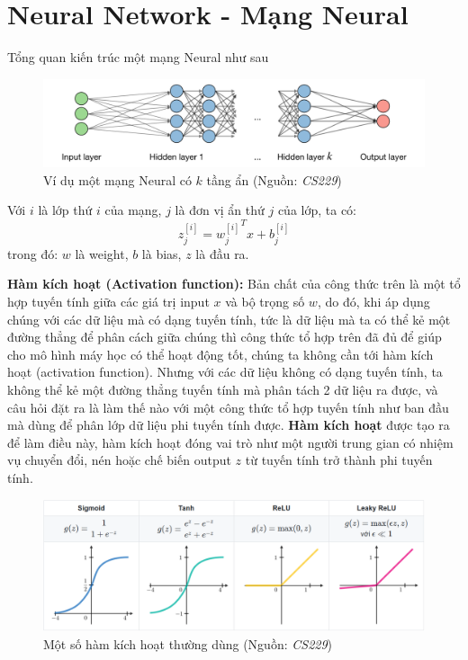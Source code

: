 \documentclass[a4paper, 12pt]{report}
\begin{document}
\section{Neural Network - Mạng Neural}
Tổng quan kiến trúc một mạng Neural như sau\par
\begin{figure}[!h]
	\centering
	\includegraphics[width=0.8\linewidth]{Images/nn1}
	\caption{Ví dụ một mạng Neural có $k$ tầng ẩn (Nguồn: \textit{CS229})}
	\label{fig:nn1}
\end{figure}
Với $i$ là lớp thứ $i$ của mạng, $j$ là đơn vị ẩn thứ $j$ của lớp, ta có:
$$ z_j^{[i]} = {w_j^{[i]}}^Tx + b_j^{[i]}$$
trong đó: $w$ là weight, $b$ là bias, $z$ là đầu ra. \par
\textbf{Hàm kích hoạt (Activation function):} Bản chất của công thức trên là một tổ hợp tuyến tính giữa các giá trị input $x$ và bộ trọng số $w$, do đó, khi áp dụng chúng với các dữ liệu mà có dạng tuyến tính, tức là dữ liệu mà ta có thể kẻ một đường thẳng để phân cách giữa chúng thì công thức tổ hợp trên đã đủ để giúp cho mô hình máy học có thể hoạt động tốt, chúng ta không cần tới hàm kích hoạt (activation function). Nhưng với các dữ liệu không có dạng tuyến tính, ta không thể kẻ một đường thẳng tuyến tính mà phân tách 2 dữ liệu ra được, và câu hỏi đặt ra là làm thế nào với một công thức tổ hợp tuyến tính như ban đầu mà dùng để phân lớp dữ liệu phi tuyến tính được. \textbf{Hàm kích hoạt} được tạo ra để làm điều này, hàm kích hoạt đóng vai trò như một người trung gian có nhiệm vụ chuyển đổi, nén hoặc chế biến output $z$ từ tuyến tính trở thành phi tuyến tính. \par
\begin{figure}[!h]
	\centering
	\includegraphics[width=1\linewidth]{Images/nn2}
	\caption{Một số hàm kích hoạt thường dùng (Nguồn: \textit{CS229})}
	\label{fig:nn2}
\end{figure}%
\end{document}
